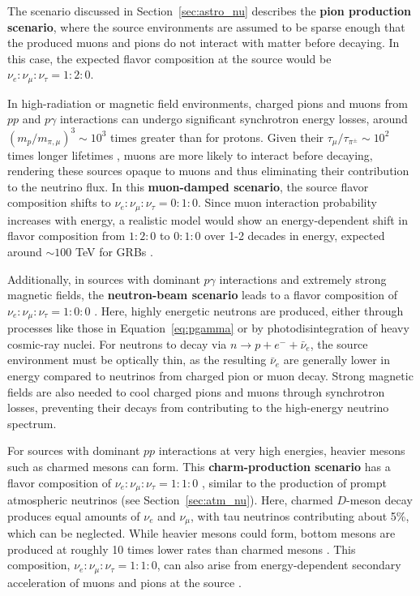 The scenario discussed in Section~\ref{sec:astro_nu} describes the \textbf{pion production scenario}, where the source environments are assumed to be sparse enough that the produced muons and pions do not interact with matter before decaying. In this case, the expected flavor composition at the source would be $\nu_e:\nu_{\mu}:\nu_{\tau} = 1:2:0$.


In high-radiation or magnetic field environments, charged pions and muons from $pp$ and $p\gamma$ interactions can undergo significant synchrotron energy losses, around $(m_p/m_{\pi,\mu})^3 \sim 10^3$ times greater than for protons. Given their $\tau_\mu/\tau_{\pi^\pm} \sim 10^2$ times longer lifetimes , muons are more likely to interact before decaying, rendering these sources opaque to muons and thus eliminating their contribution to the neutrino flux. In this \textbf{muon-damped scenario}, the source flavor composition shifts to $\nu_e : \nu_\mu : \nu_\tau = 0 : 1 : 0$. Since muon interaction probability increases with energy, a realistic model would show an energy-dependent shift in flavor composition from $1 : 2 : 0$ to $0 : 1 : 0$ over 1-2 decades in energy, expected around $\sim 100$ TeV for GRBs .

Additionally, in sources with dominant $p\gamma$ interactions and extremely strong magnetic fields, the \textbf{neutron-beam scenario} leads to a flavor composition of $\nu_e : \nu_\mu : \nu_\tau = 1 : 0 : 0$ . Here, highly energetic neutrons are produced, either through processes like those in Equation~\ref{eq:pgamma} or by photodisintegration of heavy cosmic-ray nuclei. For neutrons to decay via $n \rightarrow p + e^- + \bar{\nu}_e$, the source environment must be optically thin, as the resulting $\bar{\nu}_e$ are generally lower in energy compared to neutrinos from charged pion or muon decay. Strong magnetic fields are also needed to cool charged pions and muons through synchrotron losses, preventing their decays from contributing to the high-energy neutrino spectrum.

For sources with dominant $pp$ interactions at very high energies, heavier mesons such as charmed mesons can form. This \textbf{charm-production scenario} has a flavor composition of $\nu_e : \nu_\mu : \nu_\tau = 1 : 1 : 0$ , similar to the production of prompt atmospheric neutrinos (see Section~\ref{sec:atm_nu}). Here, charmed $D$-meson decay produces equal amounts of $\nu_e$ and $\nu_\mu$, with tau neutrinos contributing about 5\%, which can be neglected. While heavier mesons could form, bottom mesons are produced at roughly 10 times lower rates than charmed mesons . This composition, $\nu_e : \nu_\mu : \nu_\tau = 1 : 1 : 0$, can also arise from energy-dependent secondary acceleration of muons and pions at the source .


